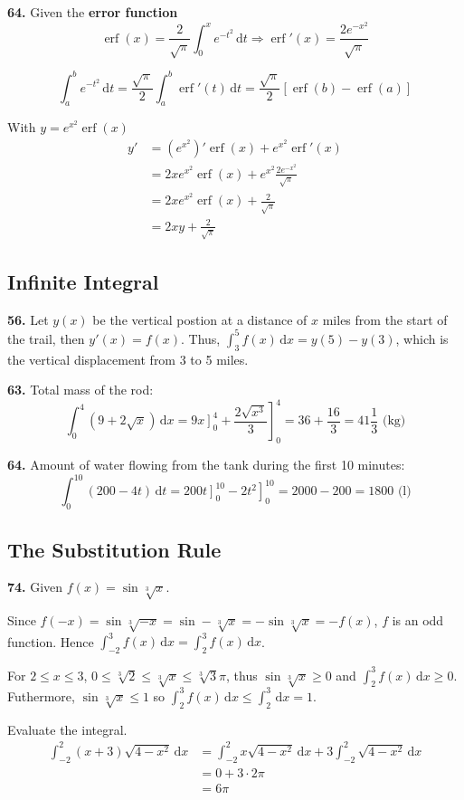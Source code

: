 \documentclass[a4paper,12pt]{article}
\newcommand{\ud}{\,\mathrm{d}}
\DeclareMathOperator{\erf}{erf}
\begin{document}
\noindent\textbf{64. }Given the \textbf{error function}
\[\erf(x) = \frac{2}{\sqrt\pi}\int_0^x e^{-t^2}\ud t
  \Longrightarrow \erf'(x) = \frac{2e^{-x^2}}{\sqrt\pi}\]

\[\int_a^b e^{-t^2}\ud t = \frac{\sqrt\pi}{2}\int_a^b \erf'(t)\ud t
                      = \frac{\sqrt\pi}{2}[\erf(b) - \erf(a)]\tag{a}\]

With $y = e^{x^2}\erf(x)$
\begin{align*}
y' &= \left(e^{x^2}\right)'\erf(x) + e^{x^2}\erf'(x)\\
   &= 2xe^{x^2}\erf(x) + e^{x^2}\frac{2e^{-x^2}}{\sqrt\pi}\\
   &= 2xe^{x^2}\erf(x) + \frac{2}{\sqrt\pi}\\
   &= 2xy + \frac{2}{\sqrt\pi}\tag{b}
\end{align*}

\subsection{Infinite Integral}
\textbf{56. }Let $y(x)$ be the vertical postion at a distance of $x$ miles from
the start of the trail, then $y'(x) = f(x)$.
Thus, $\int_3^5 f(x)\ud x = y(5) - y(3)$, which is the vertical displacement from
3 to 5 miles.

\noindent\textbf{63. }Total mass of the rod:
\[\int_0^4 (9 + 2\sqrt x)\ud x
= \left.9x\right]_0^4 + \left.\frac{2\sqrt{x^3}}{3}\right]_0^4
= 36 + \frac{16}{3} = 41\frac{1}{3}\text{ (kg)}\]

\noindent\textbf{64. }Amount of water flowing from the tank during the first 10
minutes:
\[\int_0^{10} (200 - 4t)\ud t
= \left.200t\right]_0^{10} - \left.2t^2\right]_0^{10}
= 2000 - 200 = 1800\text{ (l)}\]

\subsection{The Substitution Rule}
\textbf{74. }Given $f(x) = \sin\sqrt[3]x$.

Since $f(-x) = \sin\sqrt[3]{-x} = \sin-\sqrt[3]x = -\sin\sqrt[3]x = -f(x)$,
$f$ is an odd function. Hence $\int_{-2}^3 f(x)\ud x = \int_2^3 f(x)\ud x$.

For $2 \leq x \leq 3$, $0 \leq \sqrt[3]2 \leq \sqrt[3]x \leq \sqrt[3]3 \pi$,
thus $\sin\sqrt[3]x \geq 0$ and $\int_2^3 f(x)\ud x \geq 0$. Futhermore,
$\sin\sqrt[3]x \leq 1$ so $\int_2^3 f(x)\ud x \leq \int_2^3 \ud x = 1$.

\noindent Evaluate the integral.
\begin{align*}
   \int_{-2}^2(x + 3)\sqrt{4 - x^2}\ud x
&= \int_{-2}^2 x\sqrt{4 - x^2}\ud x + 3\int_{-2}^2\sqrt{4 - x^2}\ud x\\
&= 0 + 3 \cdot 2\pi\\
&= 6\pi\tag{77}
\end{align*}
\end{document}
